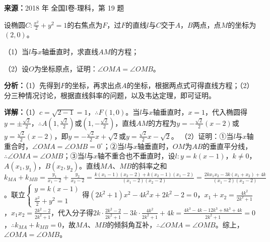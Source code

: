 \begin{question}[points=12]
\textbf{来源：}2018 年 全国I卷-理科，第 19 题\par
设椭圆$C:\frac{x^2}{2}+y^2=1$的右焦点为$F$，过$F$的直线$l$与$C$交于$A$，$B$两点，点$M$的坐标为$(2,0)$。

（1）当$l$与$x$轴垂直时，求直线$AM$的方程；

（2）设$O$为坐标原点，证明：$\angle OMA=\angle OMB$。
\begin{solution}

\textbf{分析：}（1）先得到$F$的坐标，再求出点$A$的坐标，根据两点式可得直线方程；（2）分三种情况讨论，根据直线斜率的问题，以及韦达定理，即可证明。

\textbf{详解：}（1）$c=\sqrt{2-1}=1$，$\therefore F(1,0)$。当$l$与$x$轴垂直时，$x=1$，代入椭圆得$y=\pm\frac{\sqrt{2}}{2}$，$\therefore A(1,\frac{\sqrt{2}}{2})$或$(1,-\frac{\sqrt{2}}{2})$，直线$AM$的方程为$y=-\frac{\sqrt{2}}{2}(x-2)$或$y=\frac{\sqrt{2}}{2}(x-2)$，即$y=-\frac{\sqrt{2}}{2}x+\sqrt{2}$或$y=\frac{\sqrt{2}}{2}x-\sqrt{2}$。
（2）证明：①当$l$与$x$轴重合时，$\angle OMA=\angle OMB=0^\circ$；②当$l$与$x$轴垂直时，$OM$为$AB$的垂直平分线，$\therefore \angle OMA=\angle OMB$；③当$l$与$x$轴不重合也不垂直时，设$l:y=k(x-1)$，$k\neq0$，$A(x_1,y_1)$，$B(x_2,y_2)$。直线$MA$、$MB$的斜率之和$k_{MA}+k_{MB}=\frac{y_1}{x_1-2}+\frac{y_2}{x_2-2}=\frac{k(x_1-1)(x_2-2)+k(x_2-1)(x_1-2)}{(x_1-2)(x_2-2)}=\frac{2kx_1x_2-3k(x_1+x_2)+4k}{(x_1-2)(x_2-2)}$。联立$\begin{cases} y=k(x-1) \\ \frac{x^2}{2}+y^2=1 \end{cases}$得$(2k^2+1)x^2-4k^2x+2k^2-2=0$，$x_1+x_2=\frac{4k^2}{2k^2+1}$，$x_1x_2=\frac{2k^2-2}{2k^2+1}$，代入分子得$2k\cdot\frac{2k^2-2}{2k^2+1}-3k\cdot\frac{4k^2}{2k^2+1}+4k=\frac{4k^3-4k-12k^3+8k^3+4k}{2k^2+1}=0$，$\therefore k_{MA}+k_{MB}=0$，故$MA$、$MB$的倾斜角互补，$\therefore \angle OMA=\angle OMB$。综上，$\angle OMA=\angle OMB$。
\end{solution}
\end{question}

